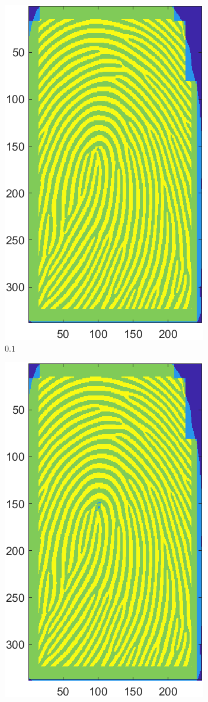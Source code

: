 \documentclass[a4paper]{article}
\begin{document}
\begin{figure}[H]
  \centering
       \begin{subfigure}[t]{0.2\textwidth}
         \centering
         \includegraphics[scale=0.5]{Figures/E4-e1-0.1}
         \caption{\(0.1\)}
     \end{subfigure}%
     \quad
     \begin{subfigure}[t]{0.2\textwidth}
         \centering
         \includegraphics[scale=0.5]{Figures/E4-e1-0.3}

\end{subfigure}
\end{figure}
\end{document}
